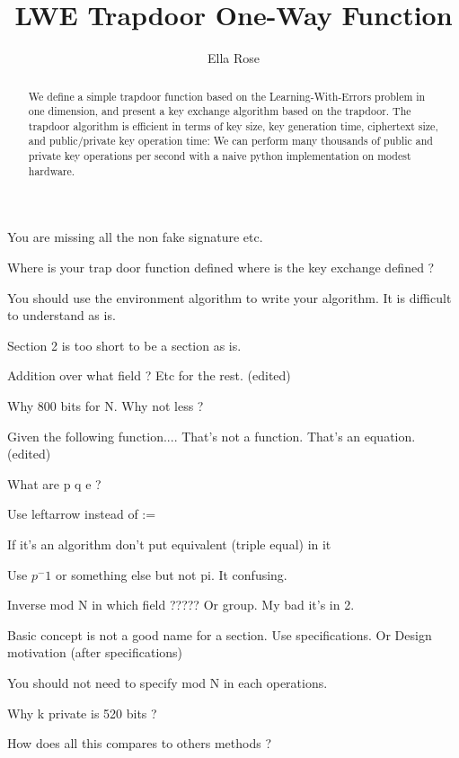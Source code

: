 \documentclass[preprint]{iacrtrans}
\author{Ella Rose}
\institute{Paso Robles, CA \email{python_pride@protonmail.com}}
\title[LWE Trapdoor One-Way Function]{LWE Trapdoor One-Way Function}
\begin{document}
\maketitle


\begin{abstract}
 We define a simple trapdoor function based on the Learning-With-Errors problem in one dimension, and present a key exchange algorithm based on the trapdoor. The trapdoor algorithm is efficient in terms of key size, key generation time, ciphertext size, and public/private key operation time: We can perform many thousands of public and private key operations per second with a naive python implementation on modest hardware. 
 \end{abstract}

\todototoc
\listoftodos
You are missing all the non fake signature etc.

Where is your trap door function defined where is the key exchange defined ?

You should use the environment algorithm to write your algorithm. It is difficult to understand as is.

Section 2 is too short to be a section as is.

Addition over what field ? Etc for the rest. (edited)

Why 800 bits for N. Why not less ?

Given the following function....
That's not a function. That's an equation. (edited)

What are p q e ?

Use leftarrow instead of :=

If it's an algorithm don't put equivalent (triple equal) in it

Use $p^-1$ or something else but not pi.
It confusing.

Inverse mod N in which field ?????
Or group.
My bad it's in 2.

Basic concept is not a good name for a section.
Use specifications.
Or Design motivation (after specifications)

You should not need to specify mod N in each operations.

Why k private is 520 bits ?

How does all this compares to others methods ?
\end{document}

